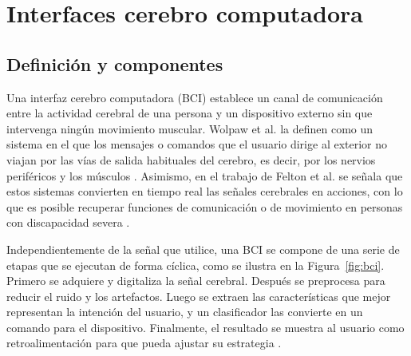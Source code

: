\section[INTERFACES CEREBRO COMPUTADORA]{Interfaces cerebro computadora}
\label{sec:bci}

\subsection{Definición y componentes}

Una interfaz cerebro computadora (BCI) establece un canal de comunicación entre la actividad
cerebral de una persona y un dispositivo externo sin que intervenga ningún movimiento muscular.
Wolpaw et al. la definen como un sistema en el que los mensajes o comandos que el usuario dirige al
exterior no viajan por las vías de salida habituales del cerebro, es decir, por los nervios
periféricos y los músculos \cite{wolpaw2002}. Asimismo, en el trabajo de Felton et al. se señala
que estos sistemas convierten en tiempo real las señales cerebrales en acciones, con lo que es
posible recuperar funciones de comunicación o de movimiento en personas con discapacidad severa
\cite{felton2007}.

Independientemente de la señal que utilice, una BCI se compone de una serie de etapas que se
ejecutan de forma cíclica, como se ilustra en la Figura~\ref{fig:bci}. Primero se adquiere y digitaliza la
señal cerebral. Después se preprocesa para reducir el ruido y los artefactos. Luego se extraen las
características que mejor representan la intención del usuario, y un clasificador las convierte en
un comando para el dispositivo. Finalmente, el resultado se muestra al usuario como
retroalimentación para que pueda ajustar su estrategia \cite{wolpaw2012,nicolasalonso2012}.

